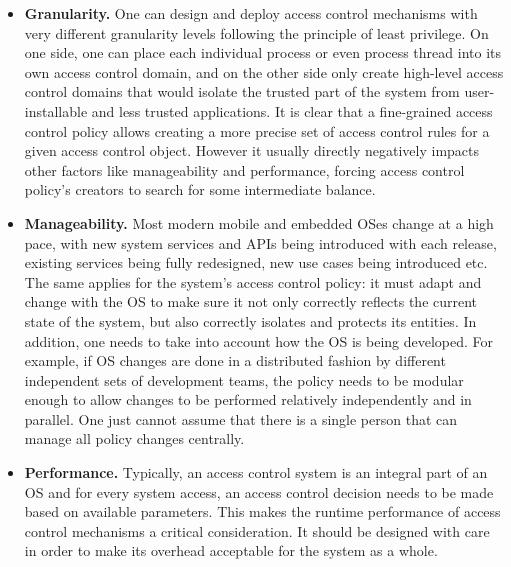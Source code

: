 \begin{itemize}
	\item \textbf{Granularity.} One can design and deploy access control mechanisms with very different granularity levels following the principle of least privilege. On one side, one can place each individual process or even process thread into its own access control domain, and on the other side only create high-level access control domains that would isolate the trusted part of the system from user-installable and less trusted applications. It is clear that a fine-grained access control policy allows creating a more precise set of access control rules for a given access control object. However it usually directly negatively impacts other factors like manageability and performance, forcing access control policy's creators to search for some intermediate balance.
	\item \textbf{Manageability.} Most modern mobile and embedded OSes change at a high pace, with new system services and APIs being introduced with each release, existing services being fully redesigned, new use cases being introduced etc. The same applies for the system's access control policy: it must adapt and change with the OS to make sure it not only correctly reflects the current state of the system, but also correctly isolates and protects its entities. In addition, one needs to take into account how the OS is being developed. For example, if OS changes are done in a distributed fashion by different independent sets of development teams, the policy needs to be modular enough to allow changes to be performed relatively independently and in parallel. One just cannot assume that there is a single person that can manage all policy changes centrally.  
	\item \textbf{Performance.} Typically, an access control system is an integral part of an OS and for every system access, an access control decision needs to be made based on available parameters. This makes the runtime performance of access control mechanisms a critical consideration. It should be designed with care in order to make its overhead acceptable for the system as a whole.  
\end{itemize}

